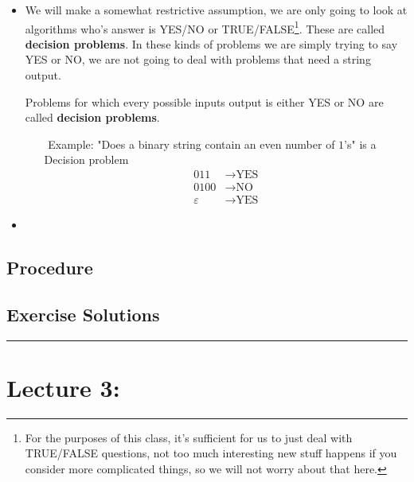 \documentclass{article}
\begin{document}
\begin{itemize}
    \item We will make a somewhat restrictive assumption, we are only going to look at algorithms who's answer is YES/NO or TRUE/FALSE\footnote{For the purposes of this class, it's sufficient for us to just deal with TRUE/FALSE questions, not too much interesting new stuff happens if you consider more complicated things, so we will not worry about that here.}. These are called \textbf{decision problems}. In these kinds of problems we are simply trying to say YES or NO, we are not going to deal with problems that need a string output. 
    \begin{tcolorbox} [title= Definition:, colback=black!10!white]
        Problems for which every possible inputs output is either YES or NO are called \textbf{decision problems}.
    \end{tcolorbox}
    \begin{itemize}
        \item[$ $] Example: "Does a binary string contain an even number of $1$'s" is a Decision problem
        \begin{align*}
            011 &\rightarrow \text{YES}\\ 
            0100 &\rightarrow \text{NO}\\
            \varepsilon &\rightarrow \text{YES}
        \end{align*}  
    \end{itemize}
    \item 
\end{itemize}

\subsection*{Procedure}
\begin{figure}[H]
    \caption*{}
\end{figure}

\subsection*{Exercise Solutions}


\begin{center}
	\rule{450pt}{1pt} 
\end{center}
\newpage

\section*{Lecture 3:}
\end{document}
